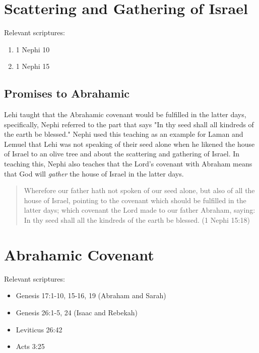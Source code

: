 \section{Scattering and Gathering of Israel}

Relevant scriptures:
\begin{enumerate}
  \item 1 Nephi 10
  \item 1 Nephi 15
\end{enumerate}

\subsection{Promises to Abrahamic}

Lehi taught that the Abrahamic covenant would be fulfilled in the latter days, specifically, Nephi referred to the part that says "In thy seed shall all kindreds of the earth be blessed." Nephi used this teaching as an example for Laman and Lemuel that Lehi was not speaking of their seed alone when he likened the house of Israel to an olive tree and about the scattering and gathering of Israel. In teaching this, Nephi also teaches that the Lord's covenant with Abraham means that God will \textit{gather} the house of Israel in the latter days.

\begin{quotation}
Wherefore our father hath not spoken of our seed alone, but also of all the house of Israel, pointing to the covenant which should be fulfilled in the latter days; which covenant the Lord made to our father Abraham, saying: In thy seed shall all the kindreds of the earth be blessed. (1 Nephi 15:18)
\end{quotation}

\section{Abrahamic Covenant}
Relevant scriptures:
\begin{itemize}
  \item Genesis 17:1-10, 15-16, 19 (Abraham and Sarah)
  \item Genesis 26:1-5, 24 (Isaac and Rebekah)
  \item Leviticus 26:42
  \item Acts 3:25
\end{itemize}
